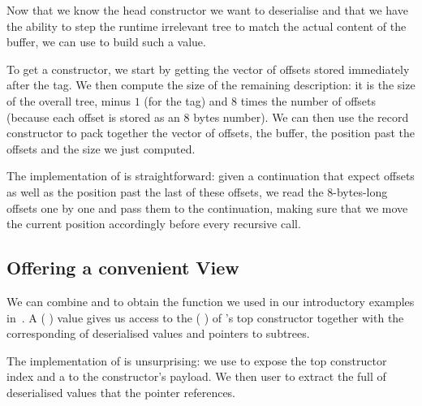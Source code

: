 Now that we know the head constructor we want to deserialise and that
we have the ability to step the runtime irrelevant tree to match the
actual content of the buffer, we can use 
to build such a value.


To get a constructor, we start by getting the vector of offsets stored
immediately after the tag. We then compute the size of the remaining
 description: it is the size of the overall tree,
minus $1$ (for the tag) and $8$ times the number of offsets (because
each offset is stored as an 8 bytes number).
%
We can then use the record constructor  to pack
together the vector of offsets, the buffer, the position past the offsets
and the size we just computed.


The implementation of  is straightforward: given
a continuation that expect  offsets as well as the
position past the last of these offsets, we read the 8-bytes-long
offsets one by one and pass them to the continuation, making sure
that we move the current position accordingly before every recursive call.

\subsection{Offering a convenient View}\label{sec:dataview}

We can combine  and  to obtain
the  function we used in our introductory examples
in~.
%
A (  ) value gives us
access to the ( ) of
's top constructor together with the corresponding
 of deserialised values and pointers to subtrees.


The implementation of  is unsurprising: we use
 to expose the top constructor index and a
 to the constructor's payload.
%
We then user  to extract the full
 of deserialised values that the
pointer references.


